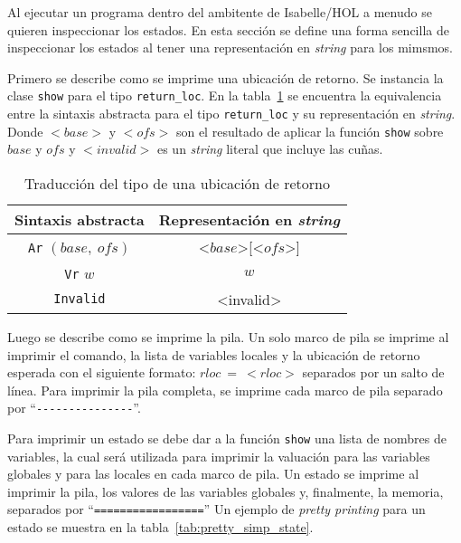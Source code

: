 Al ejecutar un programa dentro del ambitente de Isabelle/HOL a menudo se quieren inspeccionar los estados.
En esta sección se define una forma sencilla de inspeccionar los estados al tener una representación en \textit{string} para los mimsmos.

Primero se describe como se imprime una ubicación de retorno.
Se instancia la clase \verb|show| para el tipo \verb|return_loc|.
En la tabla~\ref{tab:pretty_rloc} se encuentra la equivalencia entre la sintaxis abstracta para el tipo \verb|return_loc| y su representación en \textit{string}.
Donde $<base>$ y $<ofs>$ son el resultado de aplicar la función \verb|show| sobre $base$ y $ofs$ y $<invalid>$ es un \textit{string} literal que incluye las cuñas.

\begin{table}[h!]
\centering
\begin{tabular}{|c|c|}
  \hline
  \textbf{Sintaxis abstracta} & \textbf{Representación en \textit{string}} \\ [0.5ex]
  \hline \hline
  \verb|Ar| $(base,\ ofs)$ & <$base$>[<$ofs$>] \\
  \verb|Vr| $w$ & $w$ \\
  \verb|Invalid| & <invalid> \\
  \hline
\end{tabular}

\caption{Traducción del tipo de una ubicación de retorno}
\label{tab:pretty_rloc}
\end{table}

Luego se describe como se imprime la pila.
Un solo marco de pila se imprime al imprimir el comando, la lista de variables locales y la ubicación de retorno esperada con el siguiente formato: $rloc\ =\ <rloc>$ separados por un salto de línea.
Para imprimir la pila completa, se imprime cada marco de pila separado por ``\verb|---------------|''.


Para imprimir un estado se debe dar a la función \verb|show| una lista de nombres de variables, la cual será utilizada para imprimir la valuación para las variables globales y para las locales en cada marco de pila.
Un estado se imprime al imprimir la pila, los valores de las variables globales y, finalmente, la memoria, separados por ``\verb|=================|''
Un ejemplo de \textit{pretty printing} para un estado se muestra en la tabla~\ref{tab:pretty_simp_state}.

